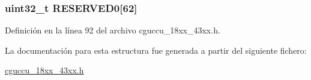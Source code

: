 \subsubsection[{\texorpdfstring{R\+E\+S\+E\+R\+V\+E\+D0}{RESERVED0}}]{ uint32\+\_\+t R\+E\+S\+E\+R\+V\+E\+D0\mbox{[}62\mbox{]}}\hypertarget{struct_l_p_c___c_c_u1___t_af715d3356c6e2bd831a1862864ef1a7e}{}\label{struct_l_p_c___c_c_u1___t_af715d3356c6e2bd831a1862864ef1a7e}


Definición en la línea 92 del archivo cguccu\+\_\+18xx\+\_\+43xx.\+h.



La documentación para esta estructura fue generada a partir del siguiente fichero\+:\begin{DoxyCompactItemize}
\item 
\hyperlink{cguccu__18xx__43xx_8h}{cguccu\+\_\+18xx\+\_\+43xx.\+h}\end{DoxyCompactItemize}
